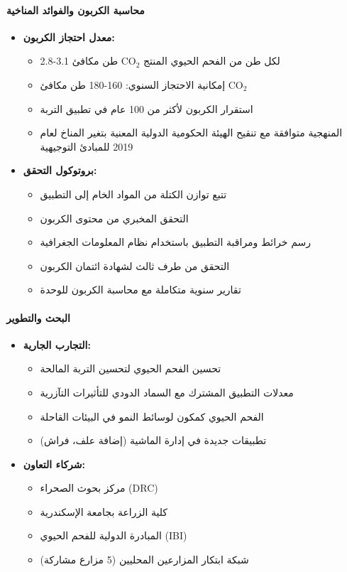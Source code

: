 \paragraph{محاسبة الكربون والفوائد المناخية}
\label{sec:biochar_carbon_capture}
\begin{itemize}
    \item \textbf{معدل احتجاز الكربون:}
    \begin{itemize}
        \item 2.8-3.1 طن مكافئ CO$_2$ لكل طن من الفحم الحيوي المنتج
        \item إمكانية الاحتجاز السنوي: 160-180 طن مكافئ CO$_2$
        \item استقرار الكربون لأكثر من 100 عام في تطبيق التربة
        \item المنهجية متوافقة مع تنقيح الهيئة الحكومية الدولية المعنية بتغير المناخ لعام 2019 للمبادئ التوجيهية
    \end{itemize}
    
    \item \textbf{بروتوكول التحقق:}
    \begin{itemize}
        \item تتبع توازن الكتلة من المواد الخام إلى التطبيق
        \item التحقق المخبري من محتوى الكربون
        \item رسم خرائط ومراقبة التطبيق باستخدام نظام المعلومات الجغرافية
        \item التحقق من طرف ثالث لشهادة ائتمان الكربون
        \item تقارير سنوية متكاملة مع محاسبة الكربون للوحدة
    \end{itemize}
\end{itemize}

\paragraph{البحث والتطوير}
\begin{itemize}
    \item \textbf{التجارب الجارية:}
    \begin{itemize}
        \item تحسين الفحم الحيوي لتحسين التربة المالحة
        \item معدلات التطبيق المشترك مع السماد الدودي للتأثيرات التآزرية
        \item الفحم الحيوي كمكون لوسائط النمو في البيئات القاحلة
        \item تطبيقات جديدة في إدارة الماشية (إضافة علف، فراش)
    \end{itemize}
    
    \item \textbf{شركاء التعاون:}
    \begin{itemize}
        \item مركز بحوث الصحراء (DRC)
        \item كلية الزراعة بجامعة الإسكندرية
        \item المبادرة الدولية للفحم الحيوي (IBI)
        \item شبكة ابتكار المزارعين المحليين (5 مزارع مشاركة)
    \end{itemize}
\end{itemize}

